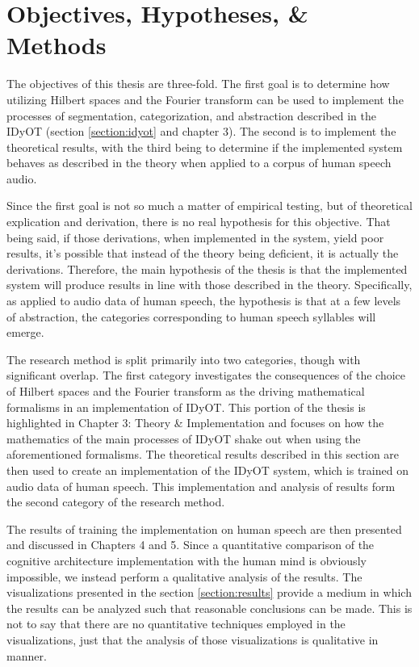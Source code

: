 \section{Objectives, Hypotheses, \& Methods}
\label{section:objectives-hypotheses-methods}

The objectives of this thesis are three-fold.  The first goal is to determine how utilizing Hilbert spaces and the Fourier transform can be used to implement the processes of segmentation, categorization, and abstraction described in the IDyOT (section \ref{section:idyot} and chapter 3).  The second is to implement the theoretical results, with the third being to determine if the implemented system behaves as described in the theory when applied to a corpus of human speech audio.

Since the first goal is not so much a matter of empirical testing, but of theoretical explication and derivation, there is no real hypothesis for this objective.  That being said, if those derivations, when implemented in the system, yield poor results, it's possible that instead of the theory being deficient, it is actually the derivations.  Therefore, the main hypothesis of the thesis is that the implemented system will produce results in line with those described in the theory.  Specifically, as applied to audio data of human speech, the hypothesis is that at a few levels of abstraction, the categories corresponding to human speech syllables will emerge.

The research method is split primarily into two categories, though with significant overlap. The first category investigates the consequences of the choice of Hilbert spaces and the Fourier transform as the driving mathematical formalisms in an implementation of IDyOT.  This portion of the thesis is highlighted in Chapter 3: Theory \& Implementation and focuses on how the mathematics of the main processes of IDyOT shake out when using the aforementioned formalisms.  The theoretical results described in this section are then used to create an implementation of the IDyOT system, which is trained on audio data of human speech.  This implementation and analysis of results form the second category of the research method.

The results of training the implementation on human speech are then presented and discussed in Chapters 4 and 5.  Since a quantitative comparison of the cognitive architecture implementation with the human mind is obviously impossible, we instead perform a qualitative analysis of the results.  The visualizations presented in the section \ref{section:results} provide a medium in which the results can be analyzed such that reasonable conclusions can be made.  This is not to say that there are no quantitative techniques employed in the visualizations, just that the analysis of those visualizations is qualitative in manner.
